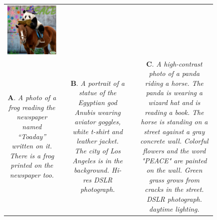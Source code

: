 \begin{figure}[ht!]
\begin{adjustwidth}{-0.8in}{-0.5in}
\begin{tabular}{cccccccccccccccccccc}
\multicolumn{6}{c}{\includegraphics[width=\thirdcolwidth\textwidth]{figures/cherries/panda.jpg}} \\
\multicolumn{6}{p{\thirdcolwidth\textwidth}}{{\tiny \textbf{A}. \textit{A photo of a frog reading the newspaper named ``Toaday'' written on it. There is a frog printed on the newspaper too.}}} && 
\multicolumn{6}{p{\thirdcolwidth\textwidth}}{{\tiny \textbf{B}. \textit{A portrait of a statue of the Egyptian god Anubis wearing aviator goggles, white t-shirt and leather jacket. The city of Los Angeles is in the background. Hi-res DSLR photograph.}}} && 
\multicolumn{6}{p{\thirdcolwidth\textwidth}}{{\tiny \textbf{C}. \textit{A high-contrast photo of a panda riding a horse. The panda is wearing a wizard hat and is reading a book. The horse is standing on a street against a gray concrete wall. Colorful flowers and the word "PEACE" are painted on the wall. Green grass grows from cracks in the street. DSLR photograph. daytime lighting.}}} \\


\end{tabular}
\end{adjustwidth}
\end{figure}
